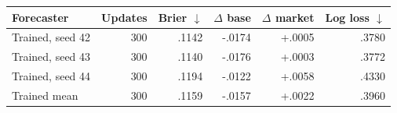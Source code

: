 \begin{tabular}{lrrrrr}
\toprule
Forecaster & Updates & Brier $\downarrow$ & $\Delta$ base & $\Delta$ market & Log loss $\downarrow$ \\
\midrule
Trained, seed 42 & 300 & .1142 & -.0174 & +.0005 & .3780 \\
Trained, seed 43 & 300 & .1140 & -.0176 & +.0003 & .3772 \\
Trained, seed 44 & 300 & .1194 & -.0122 & +.0058 & .4330 \\
\midrule
Trained mean     & 300 & .1159 & -.0157 & +.0022 & .3960 \\
\bottomrule
\end{tabular}

